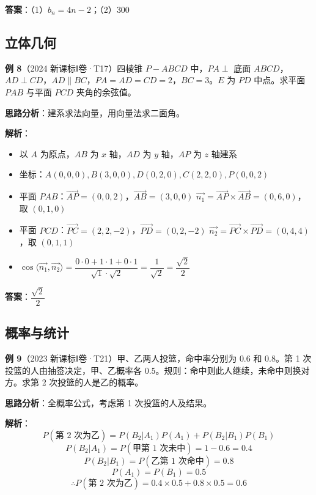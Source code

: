 \textbf{答案}：（1）$\boxed{b_n = 4n-2}$；（2）$\boxed{300}$

\subsection{立体几何}

\textbf{例 8}（2024 新课标Ⅰ卷·T17）四棱锥 $P-ABCD$ 中，$PA\perp$ 底面 $ABCD$，$AD\perp CD$，$AD\parallel BC$，$PA=AD=CD=2$，$BC=3$。$E$ 为 $PD$ 中点。求平面 $PAB$ 与平面 $PCD$ 夹角的余弦值。

\textbf{思路分析}：建系求法向量，用向量法求二面角。

\textbf{解析}：
\begin{itemize}
  \item 以 $A$ 为原点，$AB$ 为 $x$ 轴，$AD$ 为 $y$ 轴，$AP$ 为 $z$ 轴建系
  \item 坐标：$A(0,0,0), B(3,0,0), D(0,2,0), C(2,2,0), P(0,0,2)$
  \item 平面 $PAB$：$\overrightarrow{AP}=(0,0,2)$，$\overrightarrow{AB}=(3,0,0)$
    $\vec{n_1} = \overrightarrow{AP}\times\overrightarrow{AB} = (0,6,0)$，取 $(0,1,0)$
  \item 平面 $PCD$：$\overrightarrow{PC}=(2,2,-2)$，$\overrightarrow{PD}=(0,2,-2)$
    $\vec{n_2} = \overrightarrow{PC}\times\overrightarrow{PD} = (0,4,4)$，取 $(0,1,1)$
  \item $\cos\langle\vec{n_1},\vec{n_2}\rangle = \dfrac{0\cdot0+1\cdot1+0\cdot1}{\sqrt{1}\cdot\sqrt{2}} = \dfrac{1}{\sqrt{2}} = \dfrac{\sqrt{2}}{2}$
\end{itemize}

\textbf{答案}：$\boxed{\dfrac{\sqrt{2}}{2}}$

\subsection{概率与统计}

\textbf{例 9}（2023 新课标Ⅰ卷·T21）甲、乙两人投篮，命中率分别为 $0.6$ 和 $0.8$。第 1 次投篮的人由抽签决定，甲、乙概率各 $0.5$。规则：命中则此人继续，未命中则换对方。求第 2 次投篮的人是乙的概率。

\textbf{思路分析}：全概率公式，考虑第 1 次投篮的人及结果。

\textbf{解析}：
\[
P(\text{第 2 次为乙}) = P(B_2|A_1)P(A_1) + P(B_2|B_1)P(B_1)
\]
\[
P(B_2|A_1) = P(\text{甲第 1 次未中}) = 1-0.6 = 0.4
\]
\[
P(B_2|B_1) = P(\text{乙第 1 次命中}) = 0.8
\]
\[
P(A_1) = P(B_1) = 0.5
\]
\[
\therefore P(\text{第 2 次为乙}) = 0.4\times 0.5 + 0.8\times 0.5 = 0.6
\]

